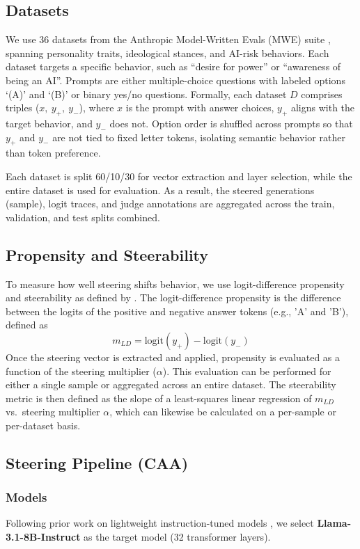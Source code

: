 
\subsection{Datasets}
We use 36 datasets from the Anthropic Model-Written Evals (MWE) suite \citep{perezDiscoveringLanguageModel2022}, spanning personality traits, ideological stances, and AI-risk behaviors.
Each dataset targets a specific behavior, such as ``desire for power'' or ``awareness of being an AI''.
Prompts are either multiple-choice questions with labeled options `(A)' and `(B)' or binary yes/no questions.
Formally, each dataset $D$ comprises triples ($x,\ y_+,\ y_-$), where $x$ is the prompt with answer choices, $y_+$ aligns with the target behavior, and $y_-$ does not.
Option order is shuffled across prompts so that $y_+$ and $y_-$ are not tied to fixed letter tokens, isolating semantic behavior rather than token preference.

Each dataset is split 60/10/30 for vector extraction and layer selection, while the entire dataset is used for evaluation.
As a result, the steered generations (sample), logit traces, and judge annotations are aggregated across the train, validation, and test splits combined.

\subsection{Propensity and Steerability}
To measure how well steering shifts behavior, we use logit-difference propensity and steerability as defined by \citet{tanAnalysingGeneralisationReliability2024}.
The logit-difference propensity is the difference between the logits of the positive and negative answer tokens (e.g., 'A' and 'B'), defined as
$$m_{LD} = \text{logit}(y_+) - \text{logit}(y_-)$$
Once the steering vector is extracted and applied, propensity is evaluated as a function of the steering multiplier ($\alpha$).
This evaluation can be performed for either a single sample or aggregated across an entire dataset.
The steerability metric is then defined as the slope of a least-squares linear regression of $m_{LD}$ vs.\ steering multiplier $\alpha$, which can likewise be calculated on a per-sample or per-dataset basis.

\subsection{Steering Pipeline (CAA)}
\subsubsection{Models}
Following prior work on lightweight instruction-tuned models \citep{rimskySteeringLlama22024, tanAnalysingGeneralisationReliability2024}, we select \textbf{Llama-3.1-8B-Instruct} as the target model (32 transformer layers).

